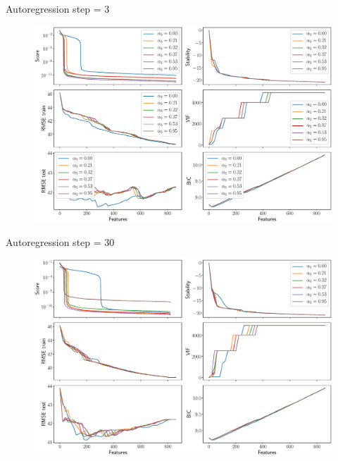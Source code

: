 \documentclass[9pt]{beamer}
\begin{document}
\begin{frame}{Autoregression step = 3}
	\begin{figure}
		\includegraphics[width=\linewidth]{figs/ecog_9_metrics.eps}
	\end{figure}
\end{frame}
\begin{frame}{Autoregression step = 30}
	\begin{figure}
		\includegraphics[width=\linewidth]{figs/ecog_90_metrics.eps}
	\end{figure}
\end{frame}
\begin{frame}{}
\end{frame}
\end{document}
